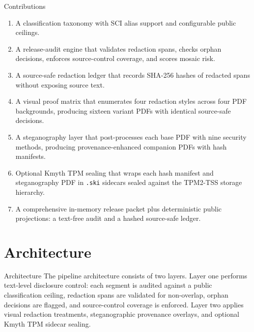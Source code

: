 \documentclass[
  ignorenonframetext,
]{beamer}
\providecommand{\tightlist}{%
  \setlength{\itemsep}{0pt}\setlength{\parskip}{0pt}}
\begin{document}
\begin{frame}{Contributions}
\protect{}\label{contributions}
\begin{enumerate}
\tightlist
\item
  A classification taxonomy with SCI alias support and configurable
  public ceilings.
\item
  A release-audit engine that validates redaction spans, checks orphan
  decisions, enforces source-control coverage, and scores mosaic risk.
\item
  A source-safe redaction ledger that records SHA-256 hashes of redacted
  spans without exposing source text.
\item
  A visual proof matrix that enumerates four redaction styles across
  four PDF backgrounds, producing sixteen variant PDFs with identical
  source-safe decisions.
\item
  A steganography layer that post-processes each base PDF with nine
  security methods, producing provenance-enhanced companion PDFs with
  hash manifests.
\item
  Optional Kmyth TPM sealing that wraps each hash manifest and
  steganography PDF in \texttt{.ski} sidecars sealed against the
  TPM2-TSS storage hierarchy.
\item
  A comprehensive in-memory release packet plus deterministic public
  projections: a text-free audit and a hashed source-safe ledger.
\end{enumerate}
\end{frame}

\section{Architecture}\label{architecture}

\begin{frame}[allowframebreaks]{Architecture}
The pipeline architecture consists of two layers. Layer one performs
text-level disclosure control: each segment is audited against a public
classification ceiling, redaction spans are validated for non-overlap,
orphan decisions are flagged, and source-control coverage is enforced.
Layer two applies visual redaction treatments, steganographic provenance
overlays, and optional Kmyth TPM sidecar sealing.
\end{frame}
\end{document}
